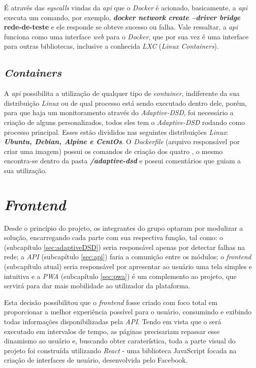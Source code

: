 É através das \textit{syscalls} vindas da \textit{api} que o \textit{Docker} é acionado, basicamente, a \textit{api} executa um comando, por exemplo, \textbf{\textit{docker network create --driver bridge} rede-de-teste} e ele responde se obteve sucesso ou falha. Vale ressaltar, a \textit{api} funciona como uma interface \textit{web} para o \textit{Docker}, que por sua vez é uma interface para outras bibliotecas, inclusive a conhecida \textit{LXC} (\textit{Linux Containers}).

\subsection{\textit{Containers}}
\label{subsec:containers}

A \textit{api} possibilita a utilização de qualquer tipo de \textit{container}, indiferente da sua distribuição \textit{Linux} ou de qual processo está sendo executado dentro dele, porém, para que haja um monitoramento através do \textit{Adaptive-DSD}, foi necessário a criação de alguns \containers{} personalizados, todos eles tem o \textit{Adaptive-DSD} rodando como processo principal. Esses \containers{} estão divididos nas seguintes distribuições \textit{Linux}: \textbf{\textit{Ubuntu, Debian, Alpine e CentOs}}. O \textit{Dockerfile} (arquivo responsável por criar uma imagem) possui os comandos de criação dos quatro \containers{}, o mesmo encontra-se dentro da pasta \textbf{\textit{/adaptive-dsd}} e possui comentários que guiam a sua utilização.



\section{\textit{Frontend}}
\label{sec:frontend}

Desde o princípio do projeto, os integrantes do grupo optaram por modulizar a solução, encarregando cada parte com sua respectiva função, tal como: o \adaptive{} (subcapítulo \ref{sec:adaptiveDSD}) seria responsável apenas por detectar falhas na rede; a \textit{API} (subcapítulo \ref{sec:api}) faria a comunição entre os módulos; o \textit{frontend} (subcapítulo atual) seria responsável por apresentar ao usuário uma tela simples e intuitiva e a \textit{PWA} (subcapítulo \ref{sec:pwa}) é um complemento ao projeto, que servirá para dar mais mobilidade ao utilizador da plataforma.

Esta decisão possibilitou que o \textit{frontend} fosse criado com foco total em proporcionar a melhor experiência possível para o usuário, consumindo e exibindo todas informações disponibilizadas pela \textit{API}. Tendo em vista que o \adaptive{}será executado em intervalos de tempo, as páginas precisariam repassar esse dinamismo ao usuário e, buscando obter caraterística, toda a parte visual do projeto foi construída utilizando \textit{React} - uma biblioteca JavaScript focada na criação de interfaces de usuário, desenvolvida pelo Facebook.


